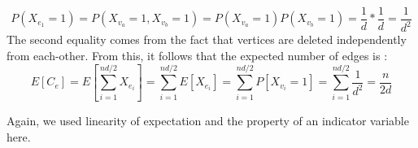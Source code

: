 \documentclass[10pt]{article}
\newenvironment{exercise}[2][Exercise]{\begin{trivlist}
  \item[\hskip \labelsep {\bfseries #1}\hskip \labelsep {\bfseries #2.}]}{\end{trivlist}}
\begin{document}
\begin{exercise}{1a}
\begin{itemize}
  \begin{equation}
      P(X_{e_1} =1) = P(X_{v_a} = 1, X_{v_b} = 1) = P(X_{v_a} = 1)P(X_{v_b} = 1) = \frac{1}{d}*\frac{1}{d} = \frac{1}{d^2}
  \end{equation}
  The second equality comes from the fact that vertices are deleted independently from each-other. From this, it follows that the expected number of edges is : 
  \begin{equation}
      E[C_e] = E[\sum_{i = 1}^{nd/2}X_{e_i}] = \sum_{i = 1}^{nd/2}E[X_{e_i}] = \sum_{i = 1}^{nd/2}P[X_{v_i}=1] = \sum_{i = 1}^{nd/2}\frac{1}{d^2} = \frac{n}{2d}
  \end{equation}
\end{itemize}
  \end{exercise}
  Again, we used linearity of expectation and the property of an indicator variable here. 
  
\end{document}
